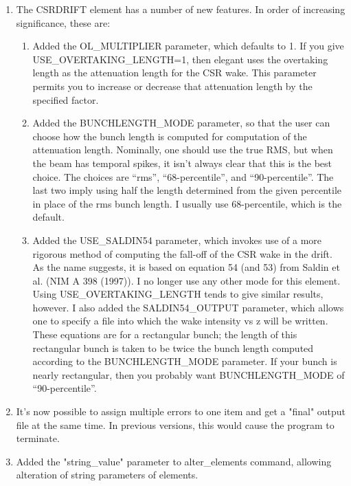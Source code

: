 \begin{enumerate}
\item The CSRDRIFT element has a number of new features.  In order of
increasing significance, these are:
\begin{enumerate}
\item  Added the OL\_MULTIPLIER parameter, which defaults to 1.  If you
give \\ USE\_OVERTAKING\_LENGTH=1, then elegant uses the overtaking length
as the attenuation length for the CSR wake.  This parameter permits
you to increase or decrease that attenuation length by the specified
factor.

\item  Added the BUNCHLENGTH\_MODE parameter, so that the user can choose
how the bunch length is computed for computation of the attenuation
length.  Nominally, one should use the true RMS, but when the beam has
temporal spikes, it isn't always clear that this is the best choice.
The choices are ``rms'', ``68-percentile'', and ``90-percentile''.  The last
two imply using half the length determined from the given percentile
in place of the rms bunch length.  I usually use 68-percentile, which
is the default.
\item  Added the USE\_SALDIN54 parameter, which invokes use of a more
rigorous method of computing the fall-off of the CSR wake in the
drift.  As the name suggests, it is based on equation 54 (and 53) from
Saldin et al. (NIM A 398 (1997)).  I no longer use any other mode for
this element.  Using USE\_OVERTAKING\_LENGTH tends to give similar
results, however.  I also added the SALDIN54\_OUTPUT parameter, which
allows one to specify a file into which the wake intensity vs z will
be written.  These equations are for a rectangular bunch; the length 
of this rectangular bunch is taken to be twice the bunch length
computed according to the BUNCHLENGTH\_MODE parameter.  If your 
bunch is nearly rectangular, then you probably want BUNCHLENGTH\_MODE
of ``90-percentile''.
\end{enumerate}

\item It's now possible to assign multiple errors to one item and get a
"final" output file at the same time.  In previous versions, this
would cause the program to terminate.

\item Added the "string\_value" parameter to alter\_elements command,
allowing alteration of string parameters of elements.


\end{enumerate}
